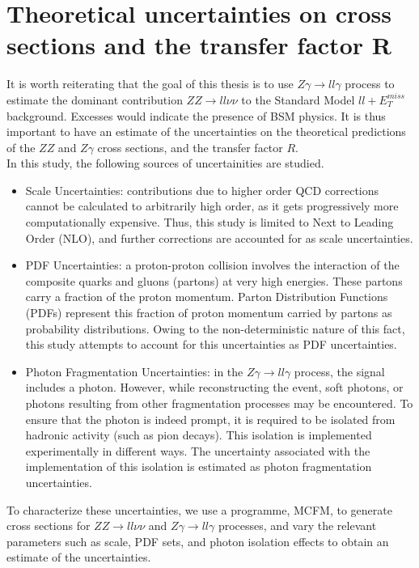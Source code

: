 \documentclass[11pt,a4paper]{report}
\newcommand{\ZZ}{$ZZ\to ll\nu\nu$ }
\newcommand{\Zg}{$Z\gamma\to ll\gamma$ }
\newcommand{\llM}{$ll+E_T^{miss}$ }
\begin{document}
\chapter{Theoretical uncertainties on cross sections and the transfer factor R}

It is worth reiterating that the goal of this thesis is to use \Zg process to estimate the dominant contribution \ZZ to the Standard Model \llM background. Excesses would indicate the presence of BSM physics. It is thus important to have an estimate of the uncertainties on the theoretical predictions of the $ZZ$ and $Z\gamma$ cross sections, and the transfer factor $R$.\\
In this study, the following sources of uncertainities are studied.
\begin{itemize}
\item Scale Uncertainties: contributions due to higher order QCD corrections cannot be calculated to arbitrarily high order, as it gets progressively more computationally expensive. Thus, this study is limited to Next to Leading Order (NLO), and further corrections are accounted for as scale uncertainties.
\item PDF Uncertainties: a proton-proton collision involves the interaction of the composite quarks and gluons (partons) at very high energies. These partons carry a fraction of the proton momentum. Parton Distribution Functions (PDFs) represent this fraction of proton momentum carried by partons as probability distributions. Owing to the non-deterministic nature of this fact, this study attempts to account for this uncertainties as PDF uncertainties.
\item Photon Fragmentation Uncertainties: in the \Zg process, the signal includes a photon. However, while reconstructing the event, soft photons, or photons resulting from other fragmentation processes may be encountered. To ensure that the photon is indeed prompt, it is required to be isolated from hadronic activity (such as pion decays). This isolation is implemented experimentally in different ways. The uncertainty associated with the implementation of this isolation is estimated as photon fragmentation uncertainties.
\end{itemize}

To characterize these uncertainties, we use a programme, MCFM, to generate cross sections for \ZZ and \Zg processes, and vary the relevant parameters such as scale, PDF sets, and photon isolation effects to obtain an estimate of the uncertainties.
\end{document}
